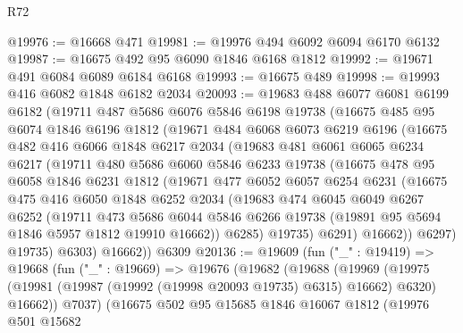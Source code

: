 \begin{lexlean}{R72}
\begin{coremodule}
@19976 := @16668 @471
@19981 := @19976 @494 @6092 @6094 @6170 @6132
@19987 := @16675 @492 @95 @6090 @1846 @6168 @1812
@19992 := @19671 @491 @6084 @6089 @6184 @6168
@19993 := @16675 @489
@19998 := @19993 @416 @6082 @1848 @6182 @2034
@20093 := @19683
    @488
    @6077
    @6081
    @6199
    @6182
    (@19711
      @487
      @5686
      @6076
      @5846
      @6198
      @19738
      (@16675
        @485
        @95
        @6074
        @1846
        @6196
        @1812
        (@19671
          @484
          @6068
          @6073
          @6219
          @6196
          (@16675
            @482
            @416
            @6066
            @1848
            @6217
            @2034
            (@19683
              @481
              @6061
              @6065
              @6234
              @6217
              (@19711
                @480
                @5686
                @6060
                @5846
                @6233
                @19738
                (@16675
                  @478
                  @95
                  @6058
                  @1846
                  @6231
                  @1812
                  (@19671
                    @477
                    @6052
                    @6057
                    @6254
                    @6231
                    (@16675
                      @475
                      @416
                      @6050
                      @1848
                      @6252
                      @2034
                      (@19683
                        @474
                        @6045
                        @6049
                        @6267
                        @6252
                        (@19711
                          @473
                          @5686
                          @6044
                          @5846
                          @6266
                          @19738
                          (@19891 @95 @5694 @1846 @5957 @1812 @19910 @16662))
                        @6285)
                      @19735)
                    @6291)
                  @16662))
              @6297)
            @19735)
          @6303)
        @16662))
    @6309
@20136 := @19609
    (fun ("_" : @19419) =>
    @19668
      (fun ("_" : @19669) =>
      @19676
        (@19682
          (@19688
            (@19969
              (@19975 (@19981 (@19987 (@19992 (@19998 @20093 @19735) @6315) @16662) @6320) @16662))
            @7037)
          (@16675
            @502
            @95
            @15685
            @1846
            @16067
            @1812
            (@19976
              @501
              @15682

\end{coremodule}
\end{lexlean}
